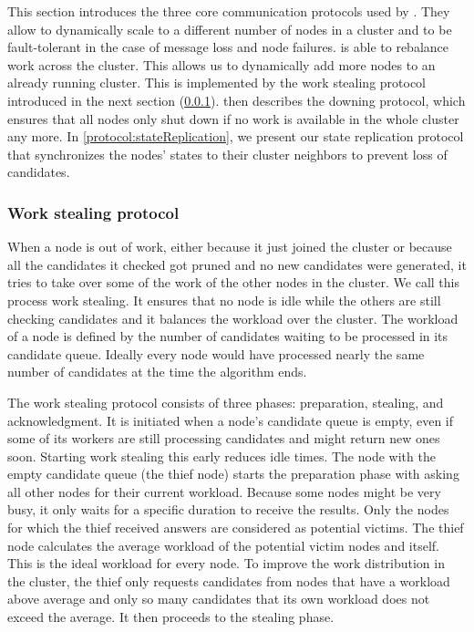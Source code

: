   This section introduces the three core communication protocols used by \dodo{}.
  They allow \dodo{} to dynamically scale to a different number of nodes in a cluster and to be fault-tolerant in the case of message loss and node failures.
  \dodo{} is able to rebalance work across the cluster.
  This allows us to dynamically add more nodes to an already running cluster.
  This is implemented by the work stealing protocol introduced in the next section (\cref{protocol:workStealing}).
   then describes the downing protocol, which ensures that all nodes only shut down if no work is available in the whole cluster any more.
  In \cref{protocol:stateReplication}, we present our state replication protocol that synchronizes the nodes' states to their cluster neighbors to prevent loss of candidates.

\subsubsection{Work stealing protocol}\label{protocol:workStealing}
  When a node is out of work, either because it just joined the cluster or because all the candidates it checked got pruned and no new candidates were generated, it tries to take over some of the work of the other nodes in the cluster.
  We call this process work stealing.
  It ensures that no node is idle while the others are still checking candidates and it balances the workload over the cluster.
  The workload of a node is defined by the number of candidates waiting to be processed in its candidate queue.
  Ideally every node would have processed nearly the same number of candidates at the time the algorithm ends.

  The work stealing protocol consists of three phases: preparation, stealing, and acknowledgment.
  It is initiated when a node's candidate queue is empty, even if some of its workers are still processing candidates and might return new ones soon.
  Starting work stealing this early reduces idle times.
  The node with the empty candidate queue (the thief node) starts the preparation phase with asking all other nodes for their current workload.
  Because some nodes might be very busy, it only waits for a specific duration to receive the results.
  Only the nodes for which the thief received answers are considered as potential victims.
  The thief node calculates the average workload of the potential victim nodes and itself.
  This is the ideal workload for every node.
  To improve the work distribution in the cluster, the thief only requests candidates from nodes that have a workload above average and only so many candidates that its own workload does not exceed the average.
  It then proceeds to the stealing phase.

